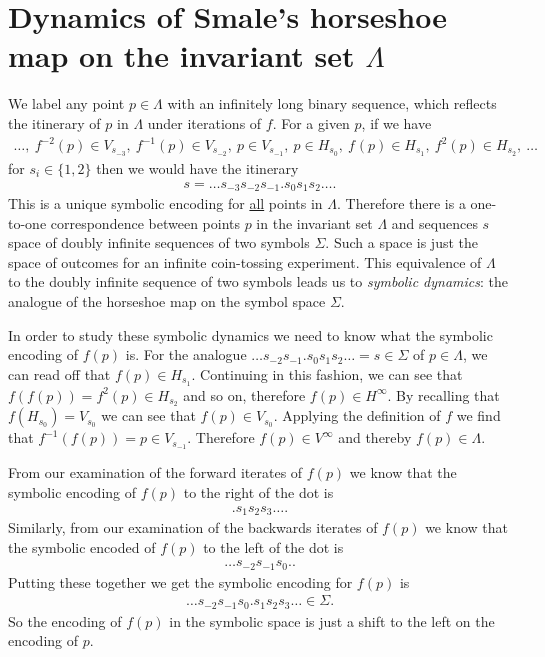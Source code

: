\section{Dynamics of Smale's horseshoe map on the invariant set $\Lambda$}
We label any point $p\in \Lambda$ with an infinitely long binary sequence, which reflects the itinerary of $p$ in $\Lambda$ under iterations of $f$. For a given $p$, if we have 
\begin{align}
	\ldots,\
	f^{-2}(p) \in V_{s_{-3}},\
	f^{-1}(p) \in V_{s_{-2}},\
	p \in V_{s_{-1}},\
	p \in H_{s_{0}},\
	f^{}(p) \in H_{s_{1}},\
	f^{2}(p) \in H_{s_{2}},\
\ldots	
\end{align}
for $s_i\in \{1,2\}$ then we would have the itinerary 
\begin{align}
	\boxed{
s  = \ldots s_{-3}s_{-2}s_{-1} \bm{.}  s_0 s_{1}s_{2}\ldots.
	}
\end{align}
This is a unique symbolic encoding for \underline{all} points in $\Lambda$. Therefore there is a one-to-one correspondence between points $p$ in the invariant set $\Lambda$ and sequences $s$ space of doubly infinite sequences of two symbols $\Sigma$. Such a space is just the space of outcomes for an infinite coin-tossing experiment. This equivalence of $\Lambda$ to the doubly infinite sequence of two symbols leads us to \emph{symbolic dynamics}: the analogue of the horseshoe map on the symbol space $\Sigma$.

In order to study these symbolic dynamics we need to know what the symbolic encoding of $f(p)$ is. For the analogue $\ldots s_{-2}s_{-1}\bm{.} s_0 s_1 s_2 \ldots = s\in \Sigma$ of $p\in \Lambda $, we can read off that $f(p)\in H_{s_1}$. Continuing in this fashion, we can see that $f(f(p))=f^{2}(p) \in H_{s_2}$ and so on, therefore $f(p)\in H^{\infty }$. By recalling that $f(H_{s_0}) = V_{s_0}$ we can see that $f(p) \in V_{s_0}$. Applying the definition of $f$ we find that $f^{-1}(f(p)) = p \in V_{s_{-1}}$. Therefore $f(p)\in V^{\infty }$ and thereby $f(p) \in \Lambda$. 

From our examination of the forward iterates of $f(p)$ we know that the symbolic encoding of $f(p)$ to the right of the dot is
\begin{align}
	\bm{.}s_1 s_2 s_3\ldots. 
\end{align}
Similarly, from our examination of the backwards iterates of $f(p)$ we know that the symbolic encoded of $f(p)$ to the left of the dot is
\begin{align}
\ldots s_{-2} s_{-1} s_{0} \bm{.}. 
\end{align}
Putting these together we get the symbolic encoding for $f(p)$ is 
\begin{align}
	\ldots s_{-2} s_{-1} s_{0} \bm{.} s_1 s_2 s_3 \ldots \in \Sigma.
\end{align}
So the encoding of $f(p)$ in the symbolic space is just a shift to the left on the encoding of $p$.

